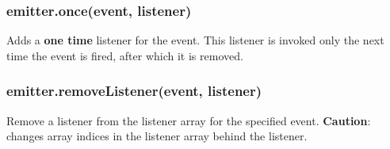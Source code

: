 \begin{Shaded}
\begin{Highlighting}[]
\NormalTok{(}\NormalTok{, } 
  \NormalTok{(}\NormalTok{);}
\NormalTok{\});}
\end{Highlighting}
\end{Shaded}

\subsubsection{emitter.once(event, listener)}

Adds a \textbf{one time} listener for the event. This listener is
invoked only the next time the event is fired, after which it is
removed.

\begin{Shaded}
\begin{Highlighting}[]
\NormalTok{(}\NormalTok{, } 
  \NormalTok{(}\NormalTok{);}
\NormalTok{\});}
\end{Highlighting}
\end{Shaded}

\subsubsection{emitter.removeListener(event, listener)}

Remove a listener from the listener array for the specified event.
\textbf{Caution}: changes array indices in the listener array behind the
listener.

\begin{Shaded}
\begin{Highlighting}[]
 
  \NormalTok{(}\NormalTok{);}
\NormalTok{\};}
\NormalTok{(}
\NormalTok{(}
\end{Highlighting}
\end{Shaded}

